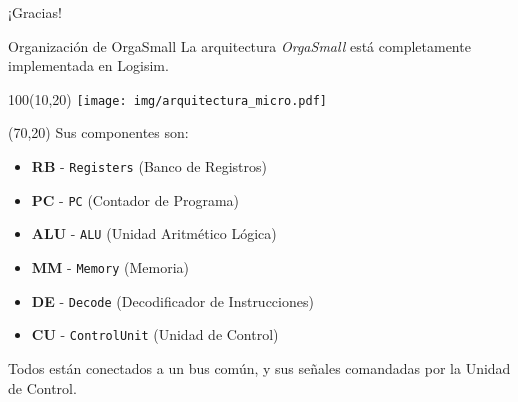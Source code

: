 \documentclass[aspectratio=169]{beamer}
\begin{document}

\begin{frame}[plain]
    \begin{center}
    \vspace{2cm}
    \huge ¡Gracias!\\
    \vspace{2cm}
    \end{center}
\end{frame}


\begin{frame}[fragile,t]{Organización de OrgaSmall}
    La arquitectura \emph{OrgaSmall} está completamente implementada en Logisim.\\
    \begin{textblock}{100}(10,20)
    \texttt{[image: img/arquitectura\_micro.pdf]}
    \end{textblock}
    \begin{textblock}{70}(70,20)
    Sus componentes son:\\
    \begin{itemize}
    \item \textbf{RB} - \texttt{Registers} (Banco de Registros)
    \item \textbf{PC} - \texttt{PC} (Contador de Programa)
    \item \textbf{ALU} - \texttt{ALU} (Unidad Aritmético Lógica)
    \item \textbf{MM} - \texttt{Memory} (Memoria)
    \item \textbf{DE} - \texttt{Decode} (Decodificador de Instrucciones)
    \item \textbf{CU} - \texttt{ControlUnit} (Unidad de Control)
    \end{itemize}
    Todos están conectados a un bus común, y sus señales comandadas por la Unidad de Control.
    \end{textblock}
\end{frame}
\end{document}
